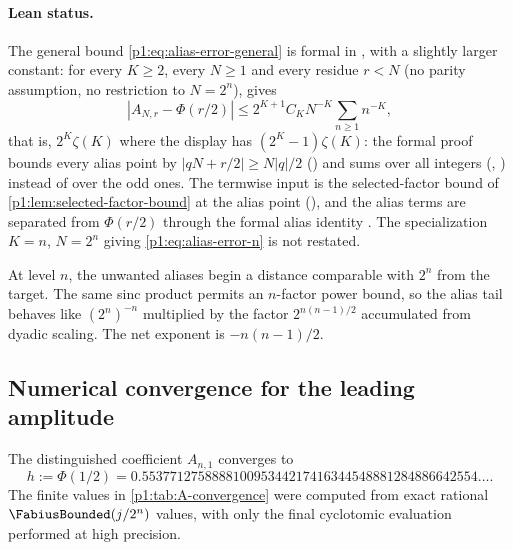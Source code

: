 \documentclass[11pt,oneside]{article}
\theoremstyle{definition}
\theoremstyle{remark}
\newcommand{\PhiU}{\Phi}
\begin{document}
\paragraph{Lean status.}
The general bound \eqref{p1:eq:alias-error-general} is formal in
, with a slightly larger constant: for every \(K\ge2\), every
\(N\ge1\) and every residue \(r<N\) (no parity assumption, no restriction to \(N=2^n\)),
 gives
\[
 |A_{N,r}-\PhiU(r/2)|\le 2^{K+1}C_KN^{-K}\sum_{n\ge1}n^{-K},
\]
that is, \(2^K\zeta(K)\) where the display has \((2^K-1)\zeta(K)\): the formal proof bounds
every alias point by \(|qN+r/2|\ge N|q|/2\) () and sums over
all integers (, )
instead of over the odd ones.  The termwise input is the selected-factor bound of
\cref{p1:lem:selected-factor-bound} at the alias point (),
and the alias terms are separated from \(\PhiU(r/2)\) through the formal alias identity
.  The specialization \(K=n\), \(N=2^n\) giving
\eqref{p1:eq:alias-error-n} is not restated.

\begin{remark}
At level $n$, the unwanted aliases begin a distance comparable with $2^n$
from the target.  The same sinc product permits an $n$-factor power bound, so
the alias tail behaves like $(2^n)^{-n}$ multiplied by the factor
$2^{n(n-1)/2}$ accumulated from dyadic scaling.  The net exponent is
$-n(n-1)/2$.
\end{remark}

\subsection{Numerical convergence for the leading amplitude}

The distinguished coefficient $A_{n,1}$ converges to
\begin{equation}\label{p1:eq:h-value}
 h:=\PhiU(1/2)
 =0.553771275888810095344217416344548881284886642554\ldots.
\end{equation}
The finite values in \cref{p1:tab:A-convergence} were computed from exact rational
$\FabiusBounded(j/2^n)$ values, with only the final cyclotomic evaluation performed at high
precision.
\end{document}
